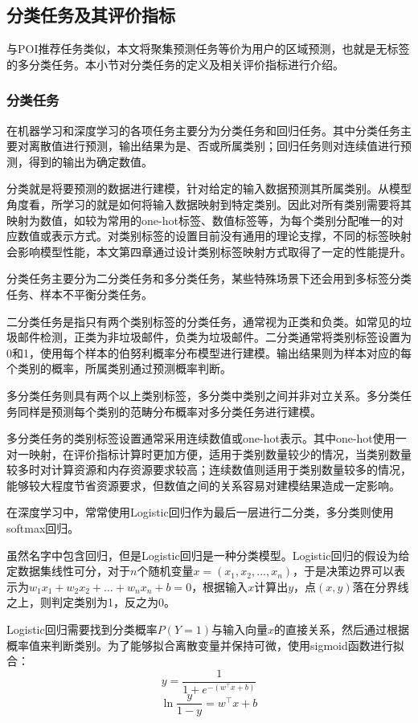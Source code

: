 \documentclass[master]{thesis-uestc}
\begin{document}
\subsection{分类任务及其评价指标}
与POI推荐任务类似，本文将聚集预测任务等价为用户的区域预测，也就是无标签的多分类任务。本小节对分类任务的定义及相关评价指标进行介绍。

\subsubsection{分类任务}
在机器学习和深度学习的各项任务主要分为分类任务和回归任务。其中分类任务主要对离散值进行预测，输出结果为是、否或所属类别；回归任务则对连续值进行预测，得到的输出为确定数值。

分类就是将要预测的数据进行建模，针对给定的输入数据预测其所属类别。从模型角度看，所学习的就是如何将输入数据映射到特定类别。因此对所有类别需要将其映射为数值，如较为常用的one-hot标签、数值标签等，为每个类别分配唯一的对应数值或表示方式。对类别标签的设置目前没有通用的理论支撑，不同的标签映射会影响模型性能，本文第四章通过设计类别标签映射方式取得了一定的性能提升。

分类任务主要分为二分类任务和多分类任务，某些特殊场景下还会用到多标签分类任务、样本不平衡分类任务。

二分类任务是指只有两个类别标签的分类任务，通常视为正类和负类。如常见的垃圾邮件检测，正类为非垃圾邮件，负类为垃圾邮件。二分类通常将类别标签设置为0和1，使用每个样本的伯努利概率分布模型进行建模。输出结果则为样本对应的每个类别的概率，所属类别通过预测概率判断。

多分类任务则具有两个以上类别标签，多分类中类别之间并非对立关系。多分类任务同样是预测每个类别的范畴分布概率对多分类任务进行建模。

多分类任务的类别标签设置通常采用连续数值或one-hot表示。其中one-hot使用一对一映射，在评价指标计算时更加方便，适用于类别数量较少的情况，当类别数量较多时对计算资源和内存资源要求较高；连续数值则适用于类别数量较多的情况，能够较大程度节省资源要求，但数值之间的关系容易对建模结果造成一定影响。

在深度学习中，常常使用Logistic回归作为最后一层进行二分类，多分类则使用softmax回归。

虽然名字中包含回归，但是Logistic回归是一种分类模型。Logistic回归的假设为给定数据集线性可分，对于$n$个随机变量$x=(x_1,x_2,\dots,x_n)$，于是决策边界可以表示为$w_1x_1+w_2x_2+\dots+w_nx_n+b=0$，根据输入$x$计算出$y$，点$(x,y)$落在分界线之上，则判定类别为1，反之为0。

Logistic回归需要找到分类概率$P(Y=1)$与输入向量$x$的直接关系，然后通过根据概率值来判断类别。为了能够拟合离散变量并保持可微，使用sigmoid函数进行拟合：
\begin{equation}
   y=\frac{1}{1+e^{-(w^{\top}x+b)}}
\end{equation}
\begin{equation}
   \ln\frac{y}{1-y}=w^{\top}x+b
\end{equation}
\end{document}
